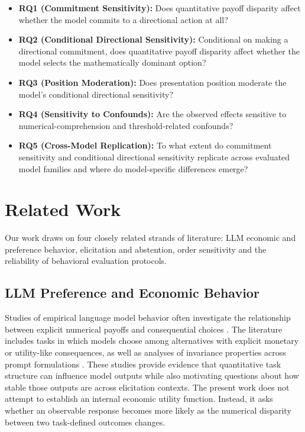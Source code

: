 \documentclass[10pt,journal,compsoc]{IEEEtran}
\begin{document}
\begin{itemize}
    \item \textbf{RQ1 (Commitment Sensitivity):} Does quantitative payoff disparity affect whether the model commits to a directional action at all?
    \item \textbf{RQ2 (Conditional Directional Sensitivity):} Conditional on making a directional commitment, does quantitative payoff disparity affect whether the model selects the mathematically dominant option?
    \item \textbf{RQ3 (Position Moderation):} Does presentation position moderate the model's conditional directional sensitivity?
    \item \textbf{RQ4 (Sensitivity to Confounds):} Are the observed effects sensitive to numerical-comprehension and threshold-related confounds?
    \item \textbf{RQ5 (Cross-Model Replication):} To what extent do commitment sensitivity and conditional directional sensitivity replicate across evaluated model families and where do model-specific differences emerge?
\end{itemize}

\section{Related Work}
\label{sec:related_work}

Our work draws on four closely related strands of literature: LLM economic and preference behavior, elicitation and abstention, order sensitivity and the reliability of behavioral evaluation protocols.

\subsection{LLM Preference and Economic Behavior}
Studies of empirical language model behavior often investigate the relationship between explicit numerical payoffs and consequential choices \cite{what_do_llms_want_2026,probing_preferences_2025}. The literature includes tasks in which models choose among alternatives with explicit monetary or utility-like consequences, as well as analyses of invariance properties across prompt formulations \cite{innate_econ_preferences_2026,what_do_llms_want_2026}. These studies provide evidence that quantitative task structure can influence model outputs while also motivating questions about how stable those outputs are across elicitation contexts. The present work does not attempt to establish an internal economic utility function. Instead, it asks whether an observable response becomes more likely as the numerical disparity between two task-defined outcomes changes.
\end{document}
